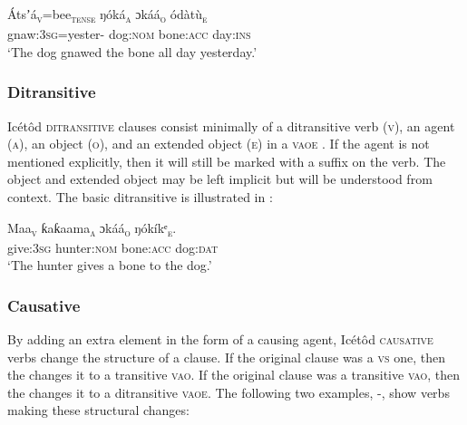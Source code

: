 \ea\label{ex:syn:14}
\gll Átsʼá\textsc{\textsubscript{v}}=bee\textsc{\textsubscript{tense}}   ŋóká\textsc{\textsubscript{a}}     ɔkáá\textsc{\textsubscript{o}}         ódàtù\textsc{\textsubscript{e}} \\
gnaw:\textsc{3sg}=yester-  dog:\textsc{nom}  bone:\textsc{acc}  day:\textsc{ins}    \\
\glt ‘The dog gnawed the bone all day yesterday.’ 
\z




\subsubsection{Ditransitive}\label{sec:10.2.3}

Icétôd \textsc{ditransitive} clauses consist minimally of a ditransitive verb (\textsc{v}), an agent (\textsc{a}), an object (\textsc{o}), and an extended object (\textsc{e}) in a \textsc{vaoe} . If the agent is not mentioned explicitly, then it will still be marked with a suffix on the verb. The object and extended object may be left implicit but will be understood from context. The basic ditransitive  is illustrated in :




\ea\label{ex:syn:15}
\gll Maa\textsc{\textsubscript{v}}     ƙaƙaama\textsc{\textsubscript{a}}   ɔkáá\textsc{\textsubscript{o}}     ŋókíkᵉ\textsc{\textsubscript{e}}. \\
give:\textsc{3sg}   hunter:\textsc{nom}   bone:\textsc{acc}   dog:\textsc{dat}    \\
\glt ‘The hunter gives a bone to the dog.’ 
\z




\subsubsection{Causative}\label{sec:10.2.4}

By adding an extra element in the form of a causing agent, Icétôd \textsc{causative} verbs change the structure of a clause. If the original clause was a \textsc{vs}  one, then the  changes it to a transitive \textsc{vao}. If the original clause was a transitive \textsc{vao}, then the  changes it to a ditransitive \textsc{vaoe}. The following two examples, -, show  verbs making these structural changes:\\




